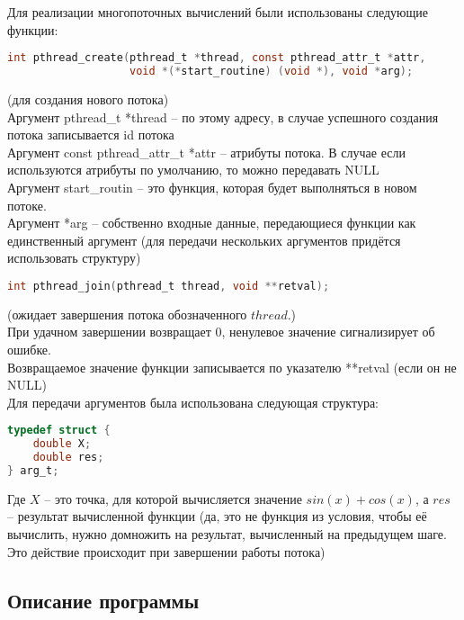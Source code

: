 \documentclass[12pt]{article}
\begin{document}
\noindent
Для реализации многопоточных вычислений были использованы следующие функции:

\begin{lstlisting}[language=c]
int pthread_create(pthread_t *thread, const pthread_attr_t *attr,
                   void *(*start_routine) (void *), void *arg);
\end{lstlisting}
(для создания нового потока)\\
Аргумент pthread\_t *thread -- по этому адресу, в случае успешного создания потока записывается id потока \\
Аргумент const pthread\_attr\_t *attr -- атрибуты потока. В случае если используются атрибуты по умолчанию, то можно передавать NULL\\
Аргумент start\_routin -- это функция, которая будет выполняться в новом потоке.\\
Аргумент *arg -- собственно входные данные, передающиеся функции как единственный аргумент (для передачи нескольких аргументов придётся использовать структуру)
\begin{lstlisting}[language=c]
int pthread_join(pthread_t thread, void **retval);
\end{lstlisting}
\noindent(ожидает завершения потока обозначенного $thread$.) \\
При удачном завершении возвращает 0, ненулевое значение сигнализирует об ошибке.\\
Возвращаемое значение функции записывается по указателю **retval (если он не NULL)
\\

\noindent
Для передачи аргументов была использована следующая структура:
\begin{lstlisting}[language=c]
typedef struct {
    double X;
    double res;
} arg_t;
\end{lstlisting}

Где $X$ -- это точка, для которой вычисляется значение $sin(x)+cos(x)$, а $res$ -- результат вычисленной функции (да, это не функция из условия, чтобы её вычислить, нужно домножить на результат, вычисленный на предыдущем шаге. Это действие происходит при завершении работы потока)

\subsection*{Описание программы}
\end{document}
